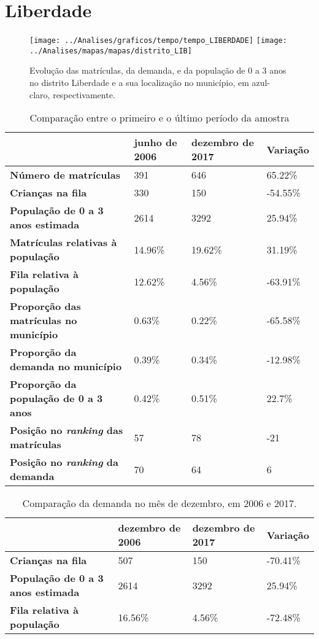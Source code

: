 \section{Liberdade}
\begin{figure}[H]
\centering
\texttt{[image: ../Analises/graficos/tempo/tempo\_LIBERDADE]}
\texttt{[image: ../Analises/mapas/mapas/distrito\_LIB]}
\caption{Evolução das matrículas, da demanda, e da população de 0 a 3 anos no distrito Liberdade e a sua localização no município, em azul-claro, respectivamente.}
\end{figure}
\begin{table}[H]
\begin{tabular}{l|l|l|l}
\textbf{}                                      & \textbf{junho de 2006}       & \textbf{dezembro de 2017}    & \textbf{Variação} \\ \hline
\textbf{Número de matrículas}                  & 391 & 646 & 65.22\% \\ \hline
\textbf{Crianças na fila}                      & 330 & 150 & -54.55\% \\ \hline
\textbf{População de 0 a 3 anos estimada}      & 2614 & 3292 & 25.94\% \\ \hline
\textbf{Matrículas relativas à população}      & 14.96\% & 19.62\% & 31.19\% \\ \hline
\textbf{Fila relativa à população}             & 12.62\% & 4.56\% & -63.91\% \\ \hline
\textbf{Proporção das matrículas no município} & 0.63\% & 0.22\% & -65.58\% \\ \hline
\textbf{Proporção da demanda no município}     & 0.39\% & 0.34\% & -12.98\% \\ \hline
\textbf{Proporção da população de 0 a 3 anos}  & 0.42\% & 0.51\% & 22.7\% \\ \hline
\textbf{Posição no \textit{ranking} das matrículas}     & 57 & 78 & -21 \\ \hline
\textbf{Posição no \textit{ranking} da demanda}         & 70 & 64 & 6 \\ 
\end{tabular}
\caption{Comparação entre o primeiro e o último período da amostra}
\end{table}
\begin{table}[H]
\begin{tabular}{l|l|l|l}
\textbf{}                                 & \textbf{dezembro de 2006} & \textbf{dezembro de 2017} & \textbf{Variação} \\ \hline
\textbf{Crianças na fila}                      & 507 & 150 & -70.41\% \\ \hline
\textbf{População de 0 a 3 anos estimada}      & 2614 & 3292 & 25.94\% \\ \hline
\textbf{Fila relativa à população}             & 16.56\% & 4.56\% & -72.48\% \\
\end{tabular}
\caption{Comparação da demanda no mês de dezembro, em 2006 e 2017.}
\end{table}
